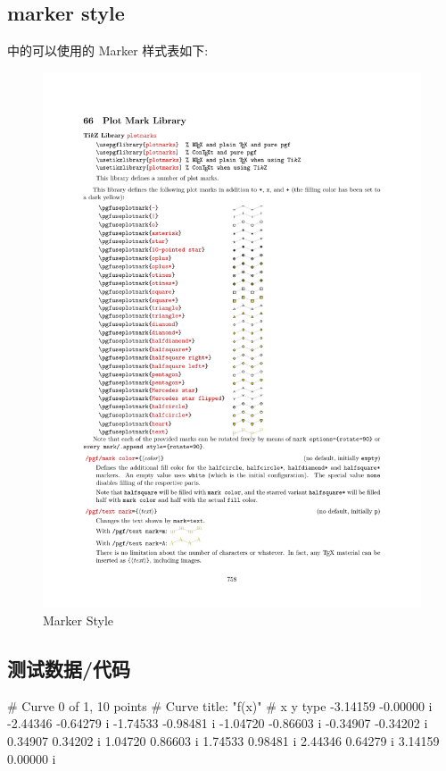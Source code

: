 \documentclass[
  hyper, lang=cn, 
  class=l3dox, 
]{../../zlatex/code/ztex}
\begin{document}
\clearpage
\subsection{marker style}
\TikZ{} 中的可以使用的 Marker 样式表如下:
\begin{figure}[!htb]
  \centering
  \includegraphics[width=\linewidth]{./support/pics/point_marker.pdf}
  \caption{\TikZ{} Marker Style}
  \label{fig:point-marker}
\end{figure}


\subsection{测试数据/代码}\label{imple:code-data}
\def\exampleUR{\textcolor{red}{\sffamily sine.data}}
\begin{DocExample}
# Curve 0 of 1, 10 points
# Curve title: "f(x)"
# x y type
-3.14159 -0.00000  i
-2.44346 -0.64279  i
-1.74533 -0.98481  i
-1.04720 -0.86603  i
-0.34907 -0.34202  i
0.34907 0.34202  i
1.04720 0.86603  i
1.74533 0.98481  i
2.44346 0.64279  i
3.14159 0.00000  i
\end{DocExample}
\end{document}
